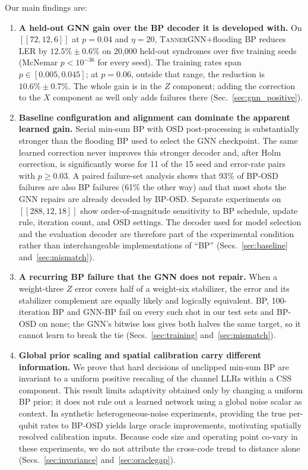 \documentclass[a4paper,twocolumn,11pt,nopdfoutputerror]{quantumarticle}
\newcommand{\code}[3]{\ensuremath{[\![#1,#2,#3]\!]}}
\begin{document}
Our main findings are:
\begin{enumerate}[leftmargin=*,topsep=3pt,itemsep=3pt]
\item \textbf{A held-out GNN gain over the BP decoder it is developed
with.} On $\code{72}{12}{6}$ at $p=0.04$ and $\eta=20$,
\textsc{TannerGNN}+flooding BP reduces LER by $12.5\%\pm0.6\%$ on
20{,}000 held-out syndromes over five training seeds (McNemar
$p<10^{-36}$ for every seed). The training rates span
$p\in[0.005,0.045]$; at $p=0.06$, outside that range, the reduction is
$10.6\%\pm0.7\%$. The whole gain is in the $Z$ component; adding the
correction to the $X$ component as well only adds failures there
(Sec.~\ref{sec:gnn_positive}).

\item \textbf{Baseline configuration and alignment can dominate the
apparent learned gain.} Serial min-sum BP with OSD post-processing is
substantially stronger than the flooding BP used to select the GNN
checkpoint. The same learned correction never improves this stronger
decoder and, after Holm correction, is significantly worse for 11 of
the 15 seed and error-rate pairs with $p\geq0.03$. A paired failure-set
analysis shows that 93\% of BP-OSD failures are also BP failures
(61\% the other way) and that most shots the GNN repairs are
already decoded by BP-OSD. Separate experiments on
$\code{288}{12}{18}$ show order-of-magnitude sensitivity to BP schedule,
update rule, iteration count, and OSD settings. The decoder used for
model selection and the evaluation decoder are therefore part of the
experimental condition rather than interchangeable implementations of
``BP''
(Secs.~\ref{sec:baseline} and~\ref{sec:mismatch}).

\item \textbf{A recurring BP failure that the GNN does not repair.} When
a weight-three $Z$ error covers half of a weight-six stabilizer, the error
and its stabilizer complement are equally likely and logically
equivalent. BP, 100-iteration BP and GNN-BP fail on every such shot in our
test sets and BP-OSD on none; the GNN's bitwise loss gives both halves the
same target, so it cannot learn to break the tie
(Secs.~\ref{sec:training} and~\ref{sec:mismatch}).

\item \textbf{Global prior scaling and spatial calibration carry
different information.} We prove that hard decisions of unclipped
min-sum BP are invariant to a uniform positive rescaling of the channel
LLRs within a CSS component. This result limits adaptivity obtained only
by changing a uniform BP prior; it does not rule out a learned network
using a global noise scalar as context. In synthetic heterogeneous-noise
experiments, providing the true per-qubit rates to BP-OSD yields large
oracle improvements, motivating spatially resolved calibration inputs.
Because code size and operating point co-vary in these experiments, we do
not attribute the cross-code trend to distance alone
(Secs.~\ref{sec:invariance} and~\ref{sec:oraclegap}).
\end{enumerate}
\end{document}
